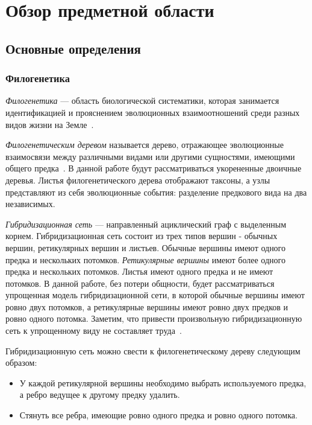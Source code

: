 \FloatBarrier
\chapter{Обзор предметной области}

\FloatBarrier
\section{Основные определения}

\subsection{Филогенетика}

\emph{Филогенетика} --- область биологической систематики, которая занимается идентификацией и прояснением эволюционных взаимоотношений среди разных видов жизни на Земле~\cite{wiki:phylogenetics}.

\emph{Филогенетическим деревом} называется дерево, отражающее эволюционные взаимосвязи между различными видами или другими сущностями, имеющими общего предка~\cite{wiki:phylogenetic-tree}.
В данной работе будут рассматриваться укорененные двоичные деревья. Листья филогенетического дерева отображают таксоны, а узлы представляют из себя эволюционные события: разделение предкового вида на два независимых.

\emph{Гибридизационная сеть} --- направленный ациклический граф с выделенным корнем.
Гибридизационная сеть состоит из трех типов вершин - обычных вершин, ретикулярных вершин и листьев.
Обычные вершины имеют одного предка и нескольких потомков.
\emph{Ретикулярные вершины} имеют более одного предка и нескольких потомков.
Листья имеют одного предка и не имеют потомков.
В данной работе, без потери общности, будет рассматриваться упрощенная модель гибридизационной сети, в которой обычные вершины имеют ровно двух потомков, а ретикулярные вершины имеют ровно двух предков и ровно одного потомка. 
Заметим, что привести произвольную гибридизационную сеть к упрощенному виду не составляет труда~\cite{wu2010close}.

Гибридизационную сеть можно свести к филогенетическому дереву следующим образом:

\begin{itemize}
	\item У каждой ретикулярной вершины необходимо выбрать используемого предка, а ребро ведущее к другому предку удалить.
	\item Стянуть все ребра, имеющие ровно одного предка и ровно одного потомка.
\end{itemize}

